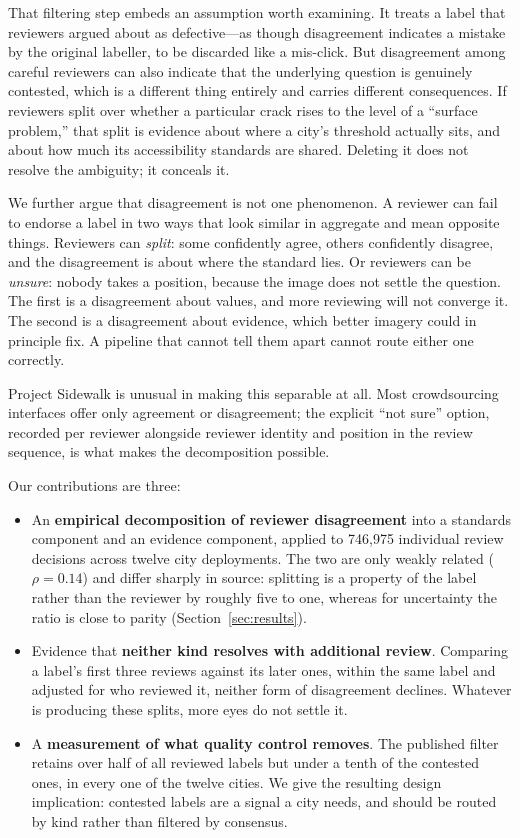 That filtering step embeds an assumption worth examining. It treats a label that
reviewers argued about as defective---as though disagreement indicates a
mistake by the original labeller, to be discarded like a mis-click. But
disagreement among careful reviewers can also indicate that the underlying
question is genuinely contested, which is a different thing entirely and carries
different consequences. If reviewers split over whether a particular crack rises
to the level of a ``surface problem,'' that split is evidence about where a
city's threshold actually sits, and about how much its accessibility standards
are shared. Deleting it does not resolve the ambiguity; it conceals it.

We further argue that disagreement is not one phenomenon. A reviewer can fail to
endorse a label in two ways that look similar in aggregate and mean opposite
things. Reviewers can \emph{split}: some confidently agree, others confidently
disagree, and the disagreement is about where the standard lies. Or reviewers can
be \emph{unsure}: nobody takes a position, because the image does not settle the
question. The first is a disagreement about values, and more reviewing will not
converge it. The second is a disagreement about evidence, which better imagery
could in principle fix. A pipeline that cannot tell them apart cannot route
either one correctly.

Project Sidewalk is unusual in making this separable at all. Most crowdsourcing
interfaces offer only agreement or disagreement; the explicit ``not sure''
option, recorded per reviewer alongside reviewer identity and position in the
review sequence, is what makes the decomposition possible.

Our contributions are three:

\begin{itemize}
\setlength\itemsep{0.1em}
\item An \textbf{empirical decomposition of reviewer disagreement} into a
  standards component and an evidence component, applied to 746{,}975
  individual review decisions across twelve city deployments. The two are only
  weakly related ($\rho = 0.14$) and differ sharply in source: splitting is a
  property of the label rather than the reviewer by roughly five to one, whereas
  for uncertainty the ratio is close to parity (Section~\ref{sec:results}).
\item Evidence that \textbf{neither kind resolves with additional review}.
  Comparing a label's first three reviews against its later ones, within the
  same label and adjusted for who reviewed it, neither form of disagreement
  declines. Whatever is producing these splits, more eyes do not settle it.
\item A \textbf{measurement of what quality control removes}. The published
  filter retains over half of all reviewed labels but under a tenth of the
  contested ones, in every one of the twelve cities. We give the resulting
  design implication: contested labels are a signal a city needs, and should be
  routed by kind rather than filtered by consensus.
\end{itemize}

